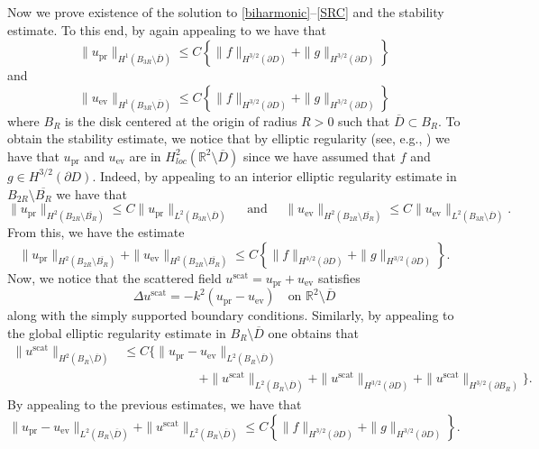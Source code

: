 \documentclass{article}
\newcommand{\exD}{\mathbb{R}^2 \setminus \overline{D}}
\numberwithin{equation}{section}
\begin{document}
Now we prove existence of the solution to  \eqref{biharmonic}--\eqref{SRC} and the stability estimate. To this end, by again appealing to \cite[Chapter 5]{Cakoni-Colton-book} we have that  
$$\| u_\textrm{pr} \|_{H^1(B_{3R} \setminus \overline{D})} \leq C \left\{\| f \|_{H^{3/2}(\partial{D})}  + \| g \|_{H^{3/2}(\partial{D})}  \right\}$$ 
and 
$$\| u_\textrm{ev} \|_{H^1(B_{3R} \setminus \overline{D})} \leq C \left\{\| f \|_{H^{3/2}(\partial{D})}  + \| g \|_{H^{3/2}(\partial{D})}  \right\}$$
where $B_R$ is the disk centered at the origin of radius $R>0$ such that $\overline{D} \subset B_R$. To obtain the stability estimate, we notice that by elliptic regularity (see, e.g., \cite[Section 8.6]{Salsa}) we have that $u_\textrm{pr}$ and $u_\textrm{ev}$ are in $H^2_{loc}(\exD)$ since we have assumed that $f$ and $g \in H^{3/2}(\partial D)$. Indeed, by appealing to an interior elliptic regularity estimate in $B_{2R} \setminus \overline{B_R}$ we have that 
$$\| u_\textrm{pr} \|_{H^2(B_{2R} \setminus \overline{B_R})} \leq C \| u_\textrm{pr} \|_{{L^2}(B_{3R} \setminus \overline{D})}  
\quad \text{ and } \quad 
\| u_\textrm{ev} \|_{H^2(B_{2R} \setminus \overline{B_R})} \leq C \| u_\textrm{ev} \|_{{L^2}(B_{3R} \setminus \overline{D})}.$$ 
From this, we have the 
estimate 
$$\| u_\textrm{pr} \|_{H^2(B_{2R} \setminus \overline{B_R})} + \| u_\textrm{ev} \|_{H^2(B_{2R} \setminus \overline{B_R})}  \leq C \left\{\| f \|_{H^{3/2}(\partial{D})}  + \| g \|_{H^{3/2}(\partial{D})}  \right\}.$$ 
Now, we notice that the scattered field $u^{\text{scat}} = u_\textrm{pr} + u_\textrm{ev}$ satisfies 
$$ \Delta u^{\text{scat}} = -k^2(u_\textrm{pr} - u_\textrm{ev}) \quad \text{on $\exD$}$$  
along with the simply supported boundary conditions. Similarly, by appealing to the global elliptic regularity estimate in $B_R \setminus \overline{D}$ one obtains that 
\begin{align*} 
\| u^{\text{scat}} \|_{H^2(B_R \setminus \overline{D})} &\leq C \Big\{ \| u_\textrm{pr} - u_\textrm{ev} \|_{L^2(B_R \setminus \overline{D})}  \\
& \hspace{1in}+ \| u^{\text{scat}} \|_{L^2(B_R \setminus \overline{D})} + \| u^{\text{scat}} \|_{H^{3/2}(\partial{D})} + \| u^{\text{scat}} \|_{H^{3/2}(\partial{B_R})}  \Big\}.
\end{align*}
By appealing to the previous estimates, we have that 
$$ \| u_\textrm{pr} - u_\textrm{ev} \|_{L^2(B_R \setminus \overline{D})}+ \| u^{\text{scat}} \|_{L^2(B_R \setminus \overline{D})} \leq C \left\{\| f \|_{H^{3/2}(\partial{D})}  + \| g \|_{H^{3/2}(\partial{D})}  \right\}.$$ 
\end{document}
